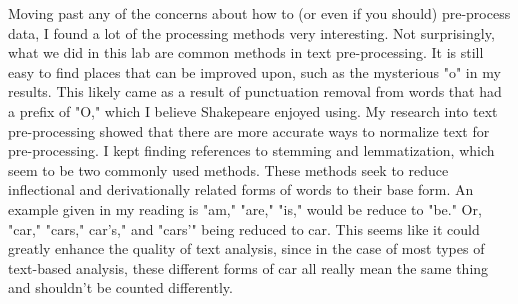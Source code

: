 \documentclass[]{article}
\begin{document}
Moving past any of the concerns about how to (or even if you should) pre-process data, I found a lot of the processing methods very interesting.  Not surprisingly, what we did in this lab are common methods in text pre-processing.  It is still easy to find places that can be improved upon, such as the mysterious "o" in my results.  This likely came as a result of punctuation removal from words that had a prefix of "O," which I believe Shakepeare enjoyed using.  My research into text pre-processing showed that there are more accurate ways to normalize text for pre-processing.  I kept finding references to stemming and lemmatization, which seem to be two commonly used methods.  These methods seek to reduce inflectional and derivationally related forms of words to their base form.  An example given in my reading is "am," "are," "is," would be reduce to "be."  Or, "car," "cars," car's," and "cars'" being reduced to car.  This seems like it could greatly enhance the quality of text analysis, since in the case of most types of text-based analysis, these different forms of car all really mean the same thing and shouldn't be counted differently.
\end{document}
